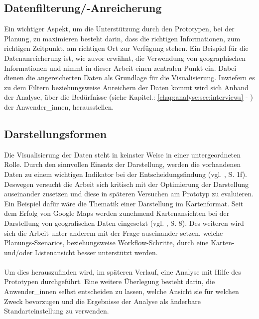 \documentclass[Bachelorarbeit.tex]{subfiles}
\begin{document}
\subsection*{Datenfilterung/-Anreicherung}
Ein wichtiger Aspekt, um die Unterstützung durch den Prototypen, bei der Planung, zu maximieren besteht darin, dass die richtigen Informationen, zum richtigen Zeitpunkt, am richtigen Ort zur Verfügung stehen. 
Ein Beispiel für die Datenanreicherung ist, wie zuvor erwähnt, die Verwendung von geographischen Informationen und nimmt in dieser Arbeit einen zentralen Punkt ein. 
Dabei dienen die angereicherten Daten als Grundlage für die Visualisierung.
Inwiefern es zu dem Filtern beziehungsweise Anreichern der Daten kommt wird sich Anhand der Analyse, über die Bedürfnisse (siehe Kapitel.: \ref{chap:analyse:sec:interviews} - ) der Anwender\_innen, herausstellen.

\subsection*{Darstellungsformen}
Die Visualisierung der Daten steht in keinster Weise in einer untergeordneten Rolle.
Durch den sinnvollen Einsatz der Darstellung, werden die vorhandenen Daten zu einem wichtigen Indikator bei der Entscheidungsfindung (vgl. \cite{Reiterer2000}, S. 1f).
Deswegen versucht die Arbeit sich kritisch mit der Optimierung der Darstellung auseinander zusetzen und diese in späteren Versuchen am Prototyp zu evaluieren.
Ein Beispiel dafür wäre die Thematik einer Darstellung im Kartenformat.
Seit dem Erfolg von Google Maps werden zunehmend Kartenansichten bei der Darstellung von geografischen Daten eingesetzt (vgl. \cite{Mitchell2008}, S. 8). 
Des weiteren wird sich die Arbeit unter anderem mit der Frage auseinander setzen, welche Planungs-Szenarios, beziehungsweise Workflow-Schritte, durch eine Karten- und/oder Listenansicht besser unterstützt werden.\\
\\
Um dies herauszufinden wird, im späteren Verlauf, eine Analyse mit Hilfe des Prototypen durchgeführt.
Eine weitere Überlegung besteht darin, die Anwender\_innen selbst entscheiden zu lassen, welche Ansicht sie für welchen Zweck bevorzugen und die Ergebnisse der Analyse als änderbare Standarteinstellung zu verwenden.
\end{document}
